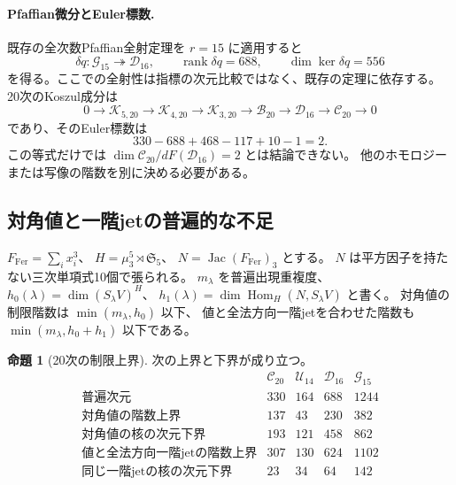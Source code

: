 \documentclass[a4paper,11pt]{ltjsarticle}
\theoremstyle{definition}
\newtheorem{proposition}[theorem]{命題}
\begin{document}
\paragraph{Pfaffian微分とEuler標数.}
既存の全次数Pfaffian全射定理を $r=15$ に適用すると
\[
 \delta q:\mathcal G_{15}\twoheadrightarrow\mathcal D_{16},\qquad
 \operatorname{rank}\delta q=688,\qquad
 \dim\ker\delta q=556
\]
を得る。ここでの全射性は指標の次元比較ではなく、既存の定理に依存する。
20次のKoszul成分は
\[
0\longrightarrow\mathcal K_{5,20}\longrightarrow\mathcal K_{4,20}
 \longrightarrow\mathcal K_{3,20}\longrightarrow\mathcal B_{20}
 \longrightarrow\mathcal D_{16}\longrightarrow\mathcal C_{20}
 \longrightarrow0
\]
であり、そのEuler標数は
\[
 330-688+468-117+10-1=2.
\]
この等式だけでは $\dim\mathcal C_{20}/dF(\mathcal D_{16})=2$ とは結論できない。
他のホモロジーまたは写像の階数を別に決める必要がある。

\subsection{対角値と一階jetの普遍的な不足}

$F_{\mathrm{Fer}}=\sum_i x_i^3$、
$H=\mu_3^5\rtimes\mathfrak S_5$、
$N=\operatorname{Jac}(F_{\mathrm{Fer}})_3$ とする。
$N$ は平方因子を持たない三次単項式10個で張られる。
$m_\lambda$ を普遍出現重複度、
$h_0(\lambda)=\dim(S_\lambda V)^H$、
$h_1(\lambda)=\dim\operatorname{Hom}_H(N,S_\lambda V)$ と書く。
対角値の制限階数は $\min(m_\lambda,h_0)$ 以下、
値と全法方向一階jetを合わせた階数も $\min(m_\lambda,h_0+h_1)$ 以下である。

\begin{proposition}[20次の制限上界]\label{prop:v15-diagonal-visibility}
次の上界と下界が成り立つ。
\[
\begin{array}{c|rrrr}
&\mathcal C_{20}&\mathcal U_{14}&\mathcal D_{16}&\mathcal G_{15}\\\hline
\text{普遍次元}&330&164&688&1244\\
\text{対角値の階数上界}&137&43&230&382\\
\text{対角値の核の次元下界}&193&121&458&862\\
\text{値と全法方向一階jetの階数上界}&307&130&624&1102\\
\text{同じ一階jetの核の次元下界}&23&34&64&142
\end{array}
\]
\end{proposition}
\end{document}
